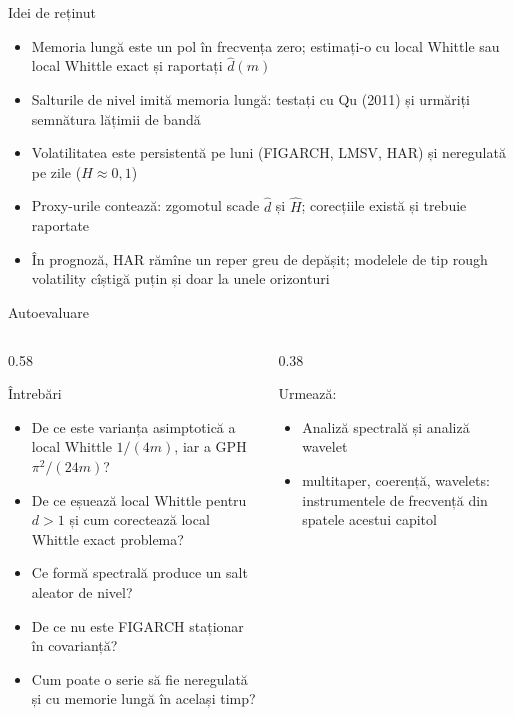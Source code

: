 \begin{frame}{Idei de reținut}
\itemsize{\small}
\begin{itemize}
    \item Memoria lungă este un pol în frecvența zero; estimați-o cu local Whittle sau local Whittle exact și raportați $\hat d(m)$
    \item Salturile de nivel imită memoria lungă: testați cu Qu (2011) și urmăriți semnătura lățimii de bandă
    \item Volatilitatea este persistentă pe luni (FIGARCH, LMSV, HAR) și neregulată pe zile ($H \approx 0{,}1$)
    \item Proxy-urile contează: zgomotul scade $\hat d$ și $\hat H$; corecțiile există și trebuie raportate
    \item În prognoză, HAR rămîne un reper greu de depășit; modelele de tip rough volatility cîștigă puțin și doar la unele orizonturi
\end{itemize}
\end{frame}

\begin{frame}{Autoevaluare}
\itemsize{\small}
\begin{columns}[T]
\begin{column}{0.58\textwidth}
\begin{block}{Întrebări}
\begin{itemize}
    \item De ce este varianța asimptotică a local Whittle $1/(4m)$, iar a GPH $\pi^2/(24m)$?
    \item De ce eșuează local Whittle pentru $d > 1$ și cum corectează local Whittle exact problema?
    \item Ce formă spectrală produce un salt aleator de nivel?
    \item De ce nu este FIGARCH staționar în covarianță?
    \item Cum poate o serie să fie neregulată și cu memorie lungă în același timp?
\end{itemize}
\end{block}
\end{column}
\begin{column}{0.38\textwidth}
\begin{block}{Urmează: }
\begin{itemize}
    \item Analiză spectrală și analiză wavelet
    \item multitaper, coerență, wavelets: instrumentele de frecvență din spatele acestui capitol
\end{itemize}
\end{block}
\end{column}
\end{columns}
\end{frame}


